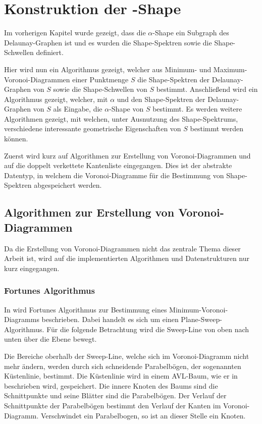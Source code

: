 
\chapter{Konstruktion der \boldmath{$\alpha$}-Shape}

Im vorherigen Kapitel wurde gezeigt, dass die $\alpha$-Shape ein Subgraph des Delaunay-Graphen ist und es wurden die Shape-Spektren sowie die Shape-Schwellen definiert.

Hier wird nun ein Algorithmus gezeigt, welcher aus Minimum- und Maximum-Voronoi-Diagrammen einer Punktmenge $S$ die Shape-Spektren der Delaunay-Graphen von $S$ sowie die Shape-Schwellen von $S$ bestimmt. Anschließend wird ein Algorithmus gezeigt, welcher, mit $\alpha$ und den Shape-Spektren der Delaunay-Graphen von $S$ als Eingabe, die $\alpha$-Shape von $S$ bestimmt. Es werden weitere Algorithmen gezeigt, mit welchen, unter Ausnutzung des Shape-Spektrums, verschiedene interessante geometrische Eigenschaften von $S$ bestimmt werden können.

Zuerst wird kurz auf Algorithmen zur Erstellung von Voronoi-Diagrammen und auf die doppelt verkettete Kantenliste eingegangen. Dies ist der abstrakte Datentyp, in welchem die Voronoi-Diagramme für die Bestimmung von Shape-Spektren abgespeichert werden.

\section{Algorithmen zur Erstellung von Voronoi-Diagrammen}

Da die Erstellung von Voronoi-Diagrammen nicht das zentrale Thema dieser Arbeit ist, wird auf die implementierten Algorithmen und Datenstrukturen nur kurz eingegangen.

\subsection*{Fortunes Algorithmus}

In \autocite{deBerg2010} wird Fortunes Algorithmus zur Bestimmung eines \- Minimum-Voronoi-Diagramms beschrieben. Dabei handelt es sich um einen \- Plane-Sweep-Algo\-rithmus. Für die folgende Betrachtung wird die Sweep-Line von oben nach unten über die Ebene bewegt.

Die Bereiche oberhalb der Sweep-Line, welche sich im Voronoi-Diagramm nicht mehr ändern, werden durch sich schneidende Parabelbögen, der sogenannten Küstenlinie, bestimmt. Die Küstenlinie wird in einem AVL-Baum, wie er in \autocite{Gueting2004} beschrieben wird, gespeichert. Die innere Knoten des Baums sind die Schnittpunkte und seine Blätter sind die Parabelbögen. Der Verlauf der Schnittpunkte der Parabelbögen bestimmt den Verlauf der Kanten im Voronoi-Diagramm. Verschwindet ein Parabelbogen, so ist an dieser Stelle ein Knoten.

